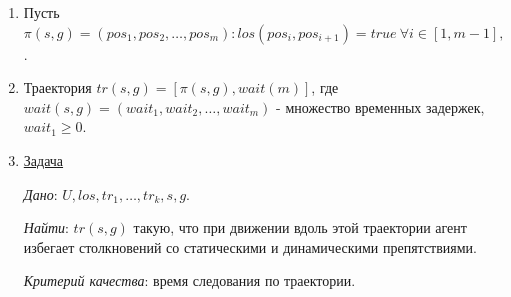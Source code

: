 \documentclass[default]{beamer}
\begin{document}
\begin{frame}
\begin{columns}
\begin{column}{0.5\textwidth}
				\begin{enumerate}
					\item Пусть $\pi(s,g)=(pos_1,pos_2,\dots,pos_m): los(pos_i,pos_{i+1})=true\ \forall i\in[1,m-1], pos_1=s,pos_m=g$.
					\item Траектория $tr(s,g)=[\pi(s,g),wait(m)]$, где $wait(s,g)=(wait_1,wait_2,\dots,wait_m)$ - множество временных задержек, $wait_1 \geq 0$.
					\item \underline{Задача}
					
					\textit{Дано}: $U,los,tr_1,\dots,tr_k,s,g$.
					
					\textit{Найти}: $tr(s,g)$ такую, что при движении вдоль этой траектории агент избегает столкновений со статическими и динамическими препятствиями.
					
					\textit{Критерий качества}: время следования по траектории.					
				\end{enumerate}
			\end{column}
		\end{columns}
	\end{frame}
\end{document}

